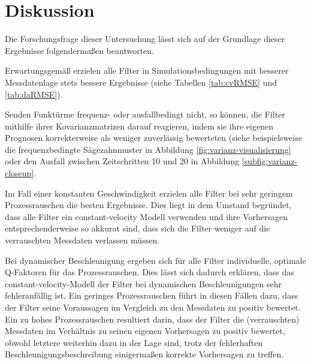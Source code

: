 \documentclass[conference]{IEEEtran}[10pt]
\begin{document}
\section{Diskussion}







Die Forschungsfrage dieser Untersuchung lässt sich auf der Grundlage dieser Ergebnisse folgendermaßen beantworten.

Erwartungsgemäß erzielen alle Filter in Simulationsbedingungen mit besserer Messdatenlage stets bessere Ergebnisse (siehe Tabellen \ref{tab:cvRMSE} und \ref{tab:daRMSE}).

Senden Funktürme frequenz- oder ausfallbedingt nicht, so können, die Filter mithilfe ihrer Kovarianzmatrizen darauf reagieren, indem sie ihre eigenen Prognosen korrekterweise als weniger zuverlässig bewerteten (siehe beispielsweise die frequenzbedingte Sägezahnmuster in Abbildung \ref{fig:varianz-visualisierung} oder den Ausfall zwischen Zeitschritten 10 und 20 in Abbildung \ref{subfig:varianz-closeup}.

Im Fall einer konstanten Geschwindigkeit erzielen alle Filter bei sehr geringem Prozessrauschen die besten Ergebnisse. Dies liegt in dem Umstand begründet, dass alle Filter ein constant-velocity Modell verwenden und ihre Vorhersagen entsprechenderweise so akkurat sind, dass sich die Filter weniger auf die verrauschten Messdaten verlassen müssen.

Bei dynamischer Beschleunigung ergeben sich für alle Filter individuelle, optimale Q-Faktoren für das Prozessrauschen. Dies lässt sich dadurch erklären, dass das constant-velocity-Modell der Filter bei dynamischen Beschleunigungen sehr fehleranfällig ist. Ein geringes Prozessrauschen führt in diesen Fällen dazu, dass der Filter seine Voraussagen im Vergleich zu den Messdaten zu positiv bewertet. Ein zu hohes Prozessrauschen resultiert darin, dass der Filter die (verrauschten) Messdaten im Verhältnis zu seinen eigenen Vorhersagen zu positiv bewertet, obwohl letztere weiterhin dazu in der Lage sind, trotz der fehlerhaften Beschleunigungsbeschreibung einigermaßen korrekte Vorhersagen zu treffen.
\end{document}
